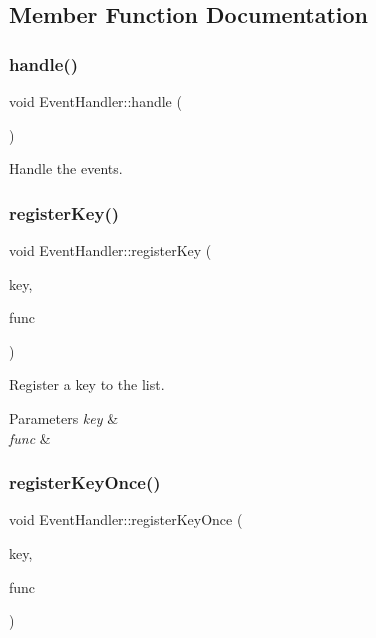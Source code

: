 \subsection{Member Function Documentation}
\mbox{\label{classEventHandler_a7ac8e1a1cc6661b4738ea521b5d91706}} 
\subsubsection{\texorpdfstring{handle()}{handle()}}
{\footnotesize\ttfamily void Event\+Handler\+::handle (\begin{DoxyParamCaption}{ }\end{DoxyParamCaption})}



Handle the events. 

\mbox{\label{classEventHandler_a088e94e8c71afe2165375074e0a27765}} 
\subsubsection{\texorpdfstring{registerKey()}{registerKey()}}
{\footnotesize\ttfamily void Event\+Handler\+::register\+Key (\begin{DoxyParamCaption}\item[{S\+D\+L\+\_\+\+Scancode}]{key,  }\item[{callback}]{func }\end{DoxyParamCaption})}



Register a key to the list. 


\begin{DoxyParams}{Parameters}
{\em key} & \\
\hline
{\em func} & \\
\hline
\end{DoxyParams}
\mbox{\label{classEventHandler_afd4a4e6d06efbc32e657a662af6bf4ef}} 
\subsubsection{\texorpdfstring{registerKeyOnce()}{registerKeyOnce()}}
{\footnotesize\ttfamily void Event\+Handler\+::register\+Key\+Once (\begin{DoxyParamCaption}\item[{S\+D\+L\+\_\+\+Scancode}]{key,  }\item[{callback}]{func }\end{DoxyParamCaption})}



